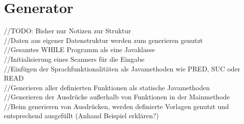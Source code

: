 \section{Generator}
//TODO: Bisher nur Notizen zur Struktur \\
//Daten aus eigener Datenstruktur werden zum generieren genutzt \\
//Gesamtes WHILE Programm als eine Javaklasse \\
//Initialisierung eines Scanners für die Eingabe \\
//Einfügen der Sprachfunktionalitäten als Javamethoden wie PRED, SUC oder READ \\
//Generieren aller definierten Funktionen als statische Javamethoden \\
//Generieren der Ausdrücke außerhalb von Funktionen in der Mainmethode \\
//Beim generieren von Ausdrücken, werden definierte Vorlagen genutzt und entsprechend ausgefüllt (Anhand Beispiel erklären?)